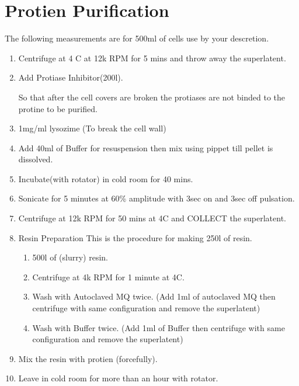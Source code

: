 \documentclass[11pt,twoside,a4paper]{article}
\begin{document}
\section{Protien Purification}
The following measurements are for 500ml of cells use by your descretion.
\begin{enumerate}
	\item Centrifuge at 4 \textdegree C at 12k RPM for 5 mins and throw away the superlatent.
	\item Add Protiase Inhibitor(200\textmu{}l).

		So that after the cell covers are broken the protiases are not binded to the protine to be purified.
	\item 1mg/ml lysozime (To break the cell wall)
	\item Add 40ml of Buffer for resuspension then mix using pippet till pellet is dissolved.
	\item Incubate(with rotator) in cold room for 40 mins.
	\item Sonicate for 5 minutes at 60\% amplitude with 3sec on and 3sec off pulsation.
	\item Centrifuge at 12k RPM for 50 mins at 4\textdegree C and COLLECT the superlatent.
	\item Resin Preparation
		This is the procedure for making 250\textmu{}l of resin.
		\begin{enumerate}
			\item 500\textmu{}l of (slurry) resin.
			\item Centrifuge at 4k RPM for 1 minute at 4\textdegree C.
			\item Wash with Autoclaved MQ twice. (Add 1ml of autoclaved MQ then centrifuge with same configuration and remove the superlatent)
			\item Wash with Buffer twice. (Add 1ml of Buffer then centrifuge with same configuration and remove the superlatent)
		\end{enumerate}
	\item Mix the resin with protien (forcefully).
	\item Leave in cold room for more than an hour with rotator.
\end{enumerate}
\end{document}
